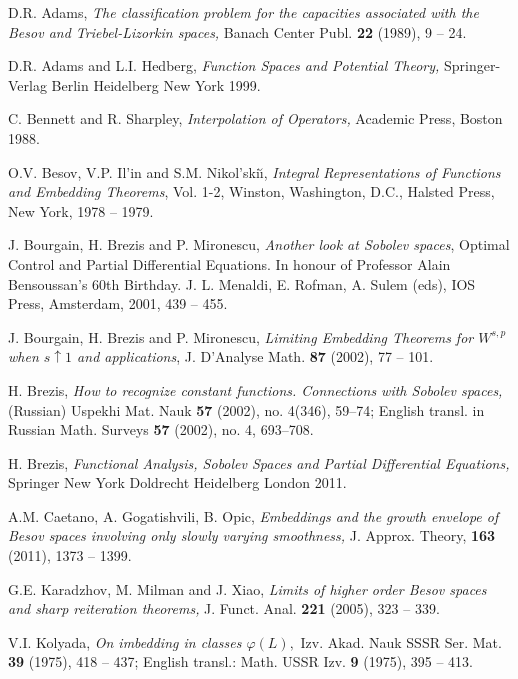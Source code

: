 \documentclass[12pt,twoside,reqno]{amsart}
\numberwithin{equation}{section}
\theoremstyle{definition}
\numberwithin{equation}{section}
\begin{document}
\begin{thebibliography}{99}

 D.R. Adams, {\it The classification problem for the
capacities associated with the Besov and Triebel-Lizorkin spaces,}
Banach Center Publ. {\bf 22} (1989), 9 -- 24.

 D.R. Adams and L.I. Hedberg, {\it Function Spaces and Potential Theory,} Springer-Verlag Berlin Heidelberg New York 1999.

 C. Bennett and R. Sharpley,  {\it Interpolation of
Operators,} Academic Press, Boston 1988.

 O.V. Besov, V.P. Il'in and S.M. Nikol'ski\u\i,
{\it Integral Representations of Functions and Embedding Theorems},
Vol. 1-2, Winston, Washington, D.C., Halsted Press, New York, 1978
-- 1979.

J. Bourgain, H. Brezis and P. Mironescu, {\it Another look at
Sobolev spaces}, Optimal Control and Partial Differential
Equations. In honour of Professor Alain Bensoussan's 60th
Birthday. J. L. Menaldi, E. Rofman, A. Sulem (eds), IOS Press,
Amsterdam, 2001, 439 -- 455.

J. Bourgain, H. Brezis and P. Mironescu, {\it Limiting Embedding
Theorems for $W^{s,p}$ when $s\uparrow 1$ and applications}, J.
D'Analyse Math. {\bf 87} (2002), 77 -- 101.

  H. Brezis, {\it How to recognize constant functions.
Connections with Sobolev spaces,} (Russian) Uspekhi Mat. Nauk {\bf
57} (2002), no. 4(346), 59--74; English transl. in Russian Math.
Surveys {\bf 57} (2002), no. 4, 693--708.

 H. Brezis, {\it Functional Analysis, Sobolev Spaces and Partial Differential Equations,}
Springer New York Doldrecht Heidelberg London 2011.

 A.M. Caetano, A. Gogatishvili, B. Opic, {\it  Embeddings and the growth envelope of Besov spaces involving only slowly varying smoothness,} J. Approx. Theory, {\bf 163} (2011),
1373 -- 1399.

 G.E. Karadzhov, M. Milman and J. Xiao, {\it Limits of higher order Besov spaces and sharp reiteration theorems,} J. Funct. Anal. {\bf 221} (2005), 323 -- 339.

V.I. Kolyada, {\it On imbedding in  classes $\varphi(L),$} Izv.
Akad. Nauk SSSR Ser. Mat. {\bf 39} (1975), 418 -- 437; English
transl.:  Math. USSR Izv. {\bf 9} (1975), 395 -- 413.


\end{thebibliography}
\end{document}
